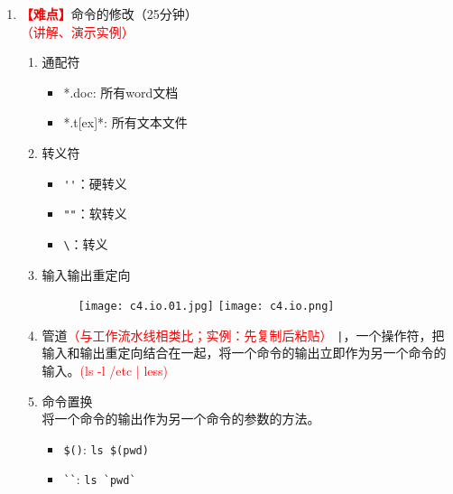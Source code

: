 \documentclass{TIJMUjiaoanLL}
\begin{document}
\begin{enumerate}
    \item \textcolor{red}{\textbf{【难点】}}命令的修改（25分钟）\\ \textcolor{red}{（讲解、演示实例）}
    \begin{enumerate}
      \item 通配符
	\begin{itemize}
	  \item *.doc: 所有word文档
	  \item *.t[ex]*: 所有文本文件
	\end{itemize}
      \item 转义符
	\begin{itemize}
	  \item \verb|''|：硬转义
	  \item \verb|""|：软转义
	  \item \verb|\|：转义
	\end{itemize}
      \item 输入输出重定向
        \vspace*{-10pt}
	\begin{figure}[h]
	  \centering
	  \texttt{[image: c4.io.01.jpg]}
	  \quad
	  \texttt{[image: c4.io.png]}
	\end{figure}
        \vspace*{-10pt}

\otherTail
\newpage
\otherHeader

      \item 管道\textcolor{red}{（与工作流水线相类比；实例：先复制后粘贴）}
	\verb=|=，一个操作符，把输入和输出重定向结合在一起，将一个命令的输出立即作为另一个命令的输入。\textcolor{red}{(ls -l /etc | less)}
      \item 命令置换
	\\ 将一个命令的输出作为另一个命令的参数的方法。
	\begin{itemize}
	  \item \verb|$()|: \verb|ls $(pwd)|
	  \item \verb|``|: \verb|ls `pwd`|
	\end{itemize}
    \end{enumerate}


\end{enumerate}
\end{document}
